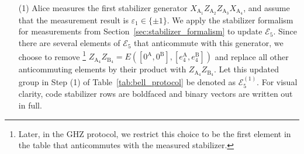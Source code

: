 \documentclass[journal,onecolumn]{IEEEtran}
\begin{document}
\begin{enumerate}

\item[(1)] Alice measures the first stabilizer generator $X_{\text{A}_1} Z_{\text{A}_2} Z_{\text{A}_3} X_{\text{A}_4}$, and %
assume that the measurement result is $\varepsilon_1 \in \{ \pm 1 \}$. %
We apply the stabilizer formalism for measurements from Section~\ref{sec:stabilizer_formalism} to update $\mathcal{E}_5$.
Since there are several elements of $\mathcal{E}_5$ that anticommute with this generator, we choose to remove%
\footnote{Later, in the GHZ protocol, we restrict this choice to be the first element in the table that anticommutes with the measured stabilizer.}
$Z_{\text{A}_4} Z_{\text{B}_4} = E([0^{\text{A}},0^{\text{B}}], [e_4^{\text{A}},e_4^{\text{B}}])$ and replace all other anticommuting elements by their product with $Z_{\text{A}_4} Z_{\text{B}_4}$.
Let this updated group in Step (1) of Table~\ref{tab:bell_protocol} be denoted as $\mathcal{E}_5^{(1)}$.
For visual clarity, code stabilizer rows are boldfaced and binary vectors are written out in full. \\


\end{enumerate}
\end{document}
